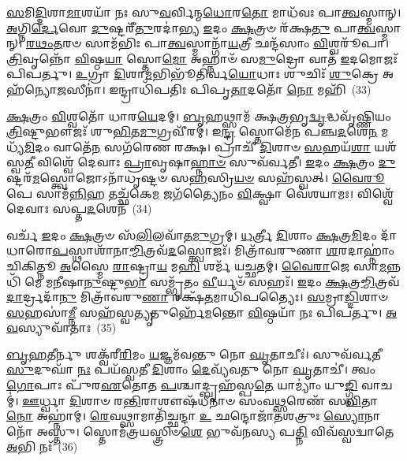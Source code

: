 {\anuvakamend[{𑌸𑌵𑍍𑌰᳴𑌤𑌾 \ul{𑌰𑍁}\-𑌦𑍍𑌰𑌾𑌣𑌾᳴\-\ul{𑌮}\-𑌯𑍁𑌤𑌂᳴ \ul{𑌚} 𑌪𑌞𑍍𑌚᳴𑌚𑌤𑍍𑌵𑌾𑌰𑌿𑍞𑌶𑌚𑍍𑌚}]}%

\-\ul{𑌸}\-𑌮𑌿\-\ul{𑌦𑍍𑌦𑌿}\-𑌶𑌾\-\ul{𑌮𑌾}\-𑌶𑌯𑌾᳴ 𑌨𑌃 𑌸𑍁\-\ul{𑌵}\-𑌰𑍍𑌵𑌿𑌨𑍍𑌮\-\ul{𑌧𑍋}\-𑌰\-\ul{𑌤𑍋} 𑌮𑌾𑌧᳴𑌵𑌃 𑌪𑌾\-\ul{𑌤𑍍𑌵}\-𑌸𑍍𑌮𑌾𑌨𑍍। \ul{𑌅}\-𑌗𑍍𑌨𑌿\-\ul{𑌰𑍍𑌦𑍇}\-𑌵𑍋 \ul{𑌦𑍁}\-𑌷𑍍𑌟𑌰𑍀᳴\-\ul{𑌤𑍁}\-𑌰𑌦𑌾॑𑌭𑍍𑌯 \ul{𑌇}\-𑌦𑌂 \ul{𑌕𑍍𑌷}\-𑌤𑍍𑌰𑍞 𑌰᳴𑌕𑍍𑌷\-\ul{𑌤𑍁} 𑌪𑌾\-\ul{𑌤𑍍𑌵}\-𑌸𑍍𑌮𑌾𑌨𑍍। \ul{𑌰}\-\-\ul{𑌥𑌂}\-\-\ul{𑌤}\-𑌰𑍞 𑌸𑌾𑌮᳴𑌭𑌿𑌃 𑌪𑌾\-\ul{𑌤𑍍𑌵}\-𑌸𑍍𑌮𑌾𑌨𑍍𑌗𑌾᳴\-\ul{𑌯}\-𑌤𑍍𑌰𑍀 𑌛𑌨𑍍𑌦᳴𑌸𑌾𑌂 \ul{𑌵𑌿}\-𑌶𑍍𑌵𑌰𑍂᳴𑌪𑌾। \ul{𑌤𑍍𑌰𑌿}\-𑌵𑍃𑌨𑍍𑌨𑍋᳴ \ul{𑌵𑌿}\-𑌷𑍍𑌠\-\ul{𑌯𑌾} 𑌸𑍍𑌤𑍋\-\ul{𑌮𑍋} 𑌅𑌹𑍍𑌨𑌾𑍞᳴ 𑌸\-\ul{𑌮𑍁}\-𑌦𑍍𑌰𑍋 𑌵𑌾𑌤᳴ \ul{𑌇}\-𑌦𑌮𑍋𑌜𑌃᳴ 𑌪𑌿𑌪𑌰𑍍𑌤𑍁। \ul{𑌉}\-𑌗𑍍𑌰𑌾 \ul{𑌦𑌿}\-𑌶𑌾\-\ul{𑌮}\-𑌭𑌿𑌭𑍂᳴𑌤𑌿𑌰𑍍𑌵\-\ul{𑌯𑍋}\-𑌧𑌾𑌃 𑌶𑍁𑌚𑌿𑌃᳴ \ul{𑌶𑍁}\-𑌕𑍍𑌰𑍇 𑌅𑌹᳴𑌨𑍍𑌯𑍋\-\ul{𑌜}\-𑌸𑍀𑌨𑌾॑। 𑌇𑌨𑍍𑌦𑍍𑌰𑌾𑌧𑌿᳴𑌪𑌤𑌿𑌃 𑌪𑌿𑌪𑍃\-\ul{𑌤𑌾}\-𑌦𑌤𑍋᳴ \ul{𑌨𑍋} 𑌮𑌹𑌿᳴~(33)

\-\ul{𑌕𑍍𑌷}\-𑌤𑍍𑌰𑌂 \ul{𑌵𑌿}\-𑌶𑍍𑌵𑌤𑍋᳴ 𑌧𑌾𑌰\-\ul{𑌯𑍇}\-𑌦𑌮𑍍। \ul{𑌬𑍃}\-𑌹𑌥𑍍𑌸𑌾𑌮᳴ 𑌕𑍍𑌷\-\ul{𑌤𑍍𑌰}\-𑌭𑍃\-\ul{𑌦𑍍𑌵𑍃}\-𑌦𑍍𑌧𑌵𑍃᳴𑌷𑍍𑌣𑌿𑌯𑌂 \ul{𑌤𑍍𑌰𑌿}\-𑌷𑍍𑌟𑍁𑌭𑍗𑌜𑌃᳴ 𑌶𑍁\-\ul{𑌭𑌿}\-𑌤\-\ul{𑌮𑍁}\-𑌗𑍍𑌰𑌵𑍀᳴𑌰𑌮𑍍। 𑌇\-\ul{𑌨𑍍𑌦𑍍𑌰} 𑌸𑍍𑌤𑍋𑌮𑍇᳴𑌨 𑌪𑌞𑍍𑌚\-\ul{𑌦}\-𑌶𑍇\-\ul{𑌨} 𑌮𑌧𑍍𑌯᳴\-\ul{𑌮𑌿}\-𑌦𑌂 𑌵𑌾𑌤𑍇᳴\-\ul{𑌨} 𑌸𑌗᳴𑌰𑍇𑌣 𑌰𑌕𑍍𑌷। 𑌪𑍍𑌰𑌾𑌚𑍀᳴ \ul{𑌦𑌿}\-𑌶𑌾𑍞 \ul{𑌸}\-𑌹𑌯᳴\-\ul{𑌶𑌾} 𑌯𑌶᳴𑌸𑍍𑌵\-\ul{𑌤𑍀} 𑌵𑌿𑌶𑍍𑌵𑍇᳴ 𑌦𑍇𑌵𑌾𑌃 \ul{𑌪𑍍𑌰𑌾}\-𑌵𑍃𑌷𑌾\-\ul{𑌹𑍍𑌨𑌾}\-\-\ul{𑍞} 𑌸𑍁𑌵᳴𑌰𑍍𑌵𑌤𑍀। \ul{𑌇}\-𑌦𑌂 \ul{𑌕𑍍𑌷}\-𑌤𑍍𑌰𑌂 \ul{𑌦𑍁}\-𑌷𑍍𑌟𑌰᳴\-\ul{𑌮}\-𑌸𑍍𑌤𑍍𑌵𑍋𑌜𑍋\-𑌽𑌨𑌾᳴𑌧𑍃𑌷𑍍𑌟𑍞 𑌸\-\ul{𑌹}\-𑌸𑍍𑌰𑌿\-\ul{𑌯}\-\-\ul{𑍞} 𑌸𑌹᳴𑌸𑍍𑌵𑌤𑍍। \ul{𑌵𑍈}\-\-\ul{𑌰𑍂}\-𑌪𑍇 𑌸𑌾𑌮᳴\-\ul{𑌨𑍍𑌨𑌿}\-𑌹 𑌤𑌚𑍍𑌛᳴𑌕𑍇\-\ul{𑌮} 𑌜𑌗᳴𑌤𑍍𑌯𑍈𑌨𑌂 \ul{𑌵𑌿}\-𑌕𑍍𑌷𑍍𑌵𑌾 𑌵𑍇᳴𑌶𑌯𑌾𑌮𑌃। 𑌵𑌿𑌶𑍍𑌵𑍇᳴ 𑌦𑍇𑌵𑌾𑌃 𑌸𑌪𑍍𑌤\-\ul{𑌦}\-𑌶𑍇𑌨᳴~(34)

𑌵𑌰𑍍𑌚᳴ \ul{𑌇}\-𑌦𑌂 \ul{𑌕𑍍𑌷}\-𑌤𑍍𑌰𑍞 𑌸᳴\-\ul{𑌲𑌿}\-𑌲𑌵𑌾᳴𑌤\-\ul{𑌮𑍁}\-𑌗𑍍𑌰𑌮𑍍। \ul{𑌧}\-𑌰𑍍𑌤𑍍𑌰𑍀 \ul{𑌦𑌿}\-𑌶𑌾𑌂 \ul{𑌕𑍍𑌷}\-𑌤𑍍𑌰\-\ul{𑌮𑌿}\-𑌦𑌂 𑌦𑌾᳴𑌧𑌾𑌰𑍋\-\ul{𑌪}\-𑌸𑍍𑌥𑌾𑌶𑌾᳴𑌨𑌾\-\ul{𑌮𑍍𑌮𑌿}\-𑌤𑍍𑌰𑌵᳴\-\ul{𑌦}\-𑌸𑍍𑌤𑍍𑌵𑍋𑌜𑌃᳴। 𑌮𑌿𑌤𑍍𑌰𑌾᳴𑌵𑌰𑍁𑌣𑌾 \ul{𑌶}\-𑌰𑌦𑌾𑌹𑍍𑌨𑌾𑌂॑ 𑌚𑌿𑌕𑌿𑌤𑍍𑌨𑍂 \ul{𑌅}\-𑌸𑍍𑌮𑍈 \ul{𑌰𑌾}\-𑌷𑍍𑌟𑍍𑌰𑌾\-\ul{𑌯} 𑌮\-\ul{𑌹𑌿} 𑌶𑌰𑍍𑌮᳴ 𑌯𑌚𑍍𑌛𑌤𑌮𑍍। \ul{𑌵𑍈}\-\-\ul{𑌰𑌾}\-𑌜𑍇 𑌸𑌾\-\ul{𑌮}\-𑌨𑍍𑌨𑌧𑌿᳴ 𑌮𑍇 𑌮\-\ul{𑌨𑍀}\-𑌷𑌾\-\ul{𑌨𑍁}\-𑌷𑍍𑌟𑍁\-\ul{𑌭𑌾} 𑌸𑌮𑍍𑌭𑍃᳴𑌤𑌂 \ul{𑌵𑍀}\-𑌰𑍍𑌯𑍞᳴ 𑌸𑌹𑌃᳴। \ul{𑌇}\-𑌦𑌂 \ul{𑌕𑍍𑌷}\-𑌤𑍍𑌰\-\ul{𑌮𑍍𑌮𑌿}\-𑌤𑍍𑌰𑌵᳴\-\ul{𑌦𑌾}\-𑌰𑍍𑌦𑍍𑌰𑌦𑌾᳴\-\ul{𑌨𑍁} 𑌮𑌿𑌤𑍍𑌰𑌾᳴𑌵𑌰𑍁\-\ul{𑌣𑌾} 𑌰𑌕𑍍𑌷᳴\-\ul{𑌤}\-𑌮𑌾𑌧𑌿᳴𑌪𑌤𑍍𑌯𑍈𑌃। \ul{𑌸}\-𑌮𑍍𑌰𑌾\-\ul{𑌡𑍍𑌦𑌿}\-𑌶𑌾𑍞 \ul{𑌸}\-𑌹𑌸𑌾॑\-\ul{𑌮𑍍𑌨𑍀} 𑌸𑌹᳴𑌸𑍍𑌵\-\ul{𑌤𑍍𑌯𑍃}\-𑌤𑍁𑌰𑍍\mbox{}𑌹𑍇᳴\-\ul{𑌮}\-𑌨𑍍𑌤𑍋 \ul{𑌵𑌿}\-𑌷𑍍𑌠𑌯𑌾᳴ 𑌨𑌃 𑌪𑌿𑌪𑌰𑍍𑌤𑍁। \ul{𑌅}\-\-\ul{𑌵}\-𑌸𑍍𑌯𑍁𑌵𑌾᳴𑌤𑌾𑌃~(35)

\-\ul{𑌬𑍃}\-\-\ul{𑌹}\-𑌤𑍀𑌰𑍍𑌨𑍁 𑌶𑌕𑍍𑌵᳴𑌰𑍀\-\ul{𑌰𑌿}\-𑌮𑌂 \ul{𑌯}\-𑌜𑍍𑌞𑌮᳴𑌵𑌨𑍍𑌤𑍁 𑌨𑍋 \ul{𑌘𑍃}\-𑌤𑌾𑌚𑍀𑌃॑। 𑌸𑍁𑌵᳴𑌰𑍍𑌵𑌤𑍀 \ul{𑌸𑍁}\-𑌦𑍁𑌘𑌾᳴ \ul{𑌨𑌃} 𑌪𑌯᳴𑌸𑍍𑌵𑌤𑍀 \ul{𑌦𑌿}\-𑌶𑌾𑌂 \ul{𑌦𑍇}\-𑌵𑍍𑌯᳴𑌵𑌤𑍁 𑌨𑍋 \ul{𑌘𑍃}\-𑌤𑌾𑌚𑍀॑। 𑌤𑍍𑌵𑌂 \ul{𑌗𑍋}\-𑌪𑌾𑌃 𑌪𑍁᳴𑌰\-\ul{𑌏}\-𑌤𑍋𑌤 \ul{𑌪}\-𑌶𑍍𑌚𑌾𑌦𑍍𑌬𑍃𑌹᳴𑌸𑍍𑌪\-\ul{𑌤𑍇} 𑌯𑌾𑌮𑍍𑌯𑌾𑌂॑ 𑌯𑍁\-\ul{𑌙𑍍𑌗𑍍𑌧𑌿} 𑌵𑌾𑌚𑌮𑍍॑। \ul{𑌊}\-𑌰𑍍𑌧𑍍𑌵𑌾 \ul{𑌦𑌿}\-𑌶𑌾𑍞 𑌰\-\ul{𑌨𑍍𑌤𑌿}\-𑌰𑌾𑌶𑍗𑌷᳴𑌧𑍀𑌨𑌾𑍞 𑌸𑌂𑌵\-\ul{𑌥𑍍𑌸}\-𑌰𑍇𑌣᳴ 𑌸\-\ul{𑌵𑌿}\-𑌤𑌾 \ul{𑌨𑍋} 𑌅𑌹𑍍𑌨𑌾॑𑌮𑍍। \ul{𑌰𑍇}\-𑌵𑌥𑍍𑌸𑌾𑌮𑌾𑌤𑌿᳴𑌚𑍍𑌛𑌨𑍍𑌦𑌾 \ul{𑌉} 𑌛𑌨𑍍𑌦𑍋𑌜𑌾᳴𑌤𑌶𑌤𑍍𑌰𑍁𑌃 \ul{𑌸𑍍𑌯𑍋}\-𑌨𑌾 𑌨𑍋᳴ 𑌅𑌸𑍍𑌤𑍁। 𑌸𑍍𑌤𑍋𑌮᳴𑌤𑍍𑌰𑌯𑌸𑍍𑌤𑍍𑌰𑌿𑍞\-\ul{𑌶𑍇} 𑌭𑍁𑌵᳴𑌨𑌸𑍍𑌯 𑌪\-\ul{𑌤𑍍𑌨𑌿} 𑌵𑌿𑌵᳴𑌸𑍍𑌵𑌦𑍍𑌵𑌾𑌤𑍇 \ul{𑌅}\-𑌭𑌿 𑌨𑌃᳴~(36)

